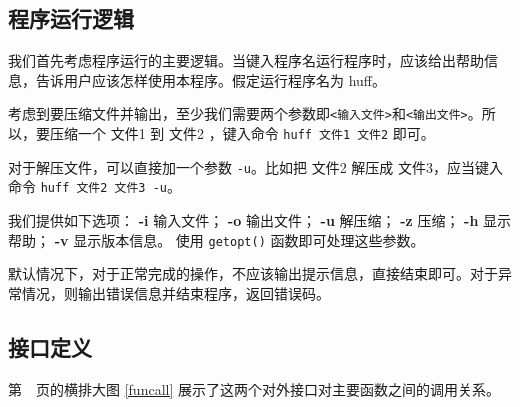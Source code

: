 \begin{sidewaysfigure}


\caption{\label{funcall}两个接口对主要函数之间的调用关系}
\end{sidewaysfigure}


\subsection{程序运行逻辑}

我们首先考虑程序运行的主要逻辑。当键入程序名运行程序时，应该给出帮助信息，告诉用户应该怎样使用本程序。假定运行程序名为 {\sf huff}。

考虑到要压缩文件并输出，至少我们需要两个参数即\verb|<输入文件>|和\verb|<输出文件>|。所以，要压缩一个 {\sf 文件1} 到 {\sf 文件2} ，键入命令 \verb|huff 文件1 文件2| 即可。

对于解压文件，可以直接加一个参数 \verb|-u|。比如把 {\sf 文件2} 解压成 {\sf 文件3}，应当键入命令 \verb|huff 文件2 文件3 -u|。

我们提供如下选项：
\textbf{-i} 输入文件；
\textbf{-o} 输出文件；
\textbf{-u} 解压缩；
\textbf{-z} 压缩；
\textbf{-h} 显示帮助；
\textbf{-v} 显示版本信息。
使用 \verb|getopt()| 函数即可处理这些参数。

默认情况下，对于正常完成的操作，不应该输出提示信息，直接结束即可。对于异常情况，则输出错误信息并结束程序，返回错误码。

\subsection{接口定义}

第~\pageref{funcall}~页的横排大图 \ref{funcall} 展示了这两个对外接口对主要函数之间的调用关系。

